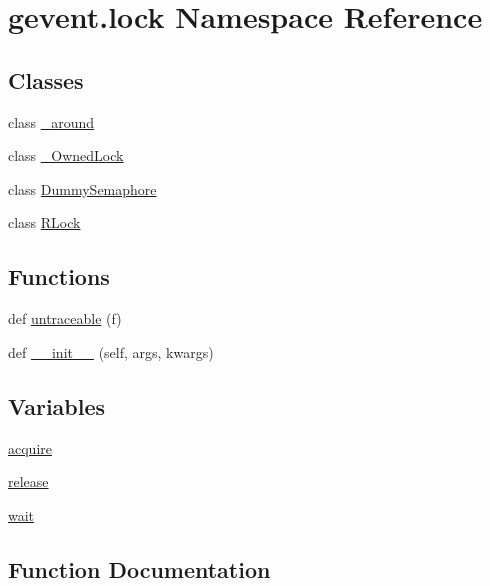 \hypertarget{namespacegevent_1_1lock}{}\section{gevent.\+lock Namespace Reference}
\label{namespacegevent_1_1lock}
\subsection*{Classes}
\begin{DoxyCompactItemize}
\item 
class \hyperlink{classgevent_1_1lock_1_1__around}{\+\_\+around}
\item 
class \hyperlink{classgevent_1_1lock_1_1___owned_lock}{\+\_\+\+Owned\+Lock}
\item 
class \hyperlink{classgevent_1_1lock_1_1_dummy_semaphore}{Dummy\+Semaphore}
\item 
class \hyperlink{classgevent_1_1lock_1_1_r_lock}{R\+Lock}
\end{DoxyCompactItemize}
\subsection*{Functions}
\begin{DoxyCompactItemize}
\item 
def \hyperlink{namespacegevent_1_1lock_a15444a7b80fc6da1a64ac0cf2644458c}{untraceable} (f)
\item 
def \hyperlink{namespacegevent_1_1lock_af0ffcbe0ff3c573e3832a518d0412be5}{\+\_\+\+\_\+init\+\_\+\+\_\+} (self, args, kwargs)
\end{DoxyCompactItemize}
\subsection*{Variables}
\begin{DoxyCompactItemize}
\item 
\hyperlink{namespacegevent_1_1lock_a8b622930dd779485ab3e41a0265d5a83}{acquire}
\item 
\hyperlink{namespacegevent_1_1lock_a5e7b0140cad9a364d96a4d457704cded}{release}
\item 
\hyperlink{namespacegevent_1_1lock_a582824c2fb99fbc71d3c3462f779173e}{wait}
\end{DoxyCompactItemize}


\subsection{Function Documentation}
\mbox{\label{namespacegevent_1_1lock_af0ffcbe0ff3c573e3832a518d0412be5}} 
